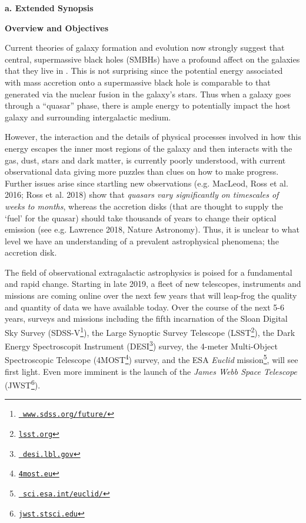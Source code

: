 \documentclass[oneside, a4paper, onecolumn, 11pt]{article}
\begin{document}
\smallskip
\smallskip
\noindent
{\bf{\textcolor{Cerulean}{a. Extended Synopsis}}} 
\vspace{6pt}

\noindent
\large
{\bf{\textcolor{Cerulean}{Overview and Objectives}}}
\normalsize

\smallskip
\noindent
Current theories of galaxy formation and evolution now strongly
suggest that central, supermassive black holes (SMBHs) have a profound
affect on the galaxies that they live in \citep{Hopkins2011}. 
 This is not surprising since
the potential energy associated with mass accretion onto a
supermassive black hole is comparable to that generated via the
nuclear fusion in the galaxy's stars. Thus when a galaxy goes through
a ``quasar'' phase, there is ample energy to
potentially impact the host galaxy and surrounding intergalactic
medium.

\smallskip
\smallskip
\noindent
However, the interaction and the details of physical processes involved in how
this energy escapes the inner most regions of the galaxy and then
interacts with the gas, dust, stars and dark matter, is currently poorly understood, 
with current observational data giving more puzzles
than clues on how to make progress. Further issues arise since startling new 
observations (e.g. MacLeod, Ross et al. 2016; Ross et al. 2018) show that {\it
quasars vary significantly on timescales of weeks to months}, whereas the
accretion disks (that are thought to supply the `fuel' for the quasar) 
should take thousands of years to change their optical emission (see
e.g. Lawrence 2018, Nature Astronomy).  Thus, it is unclear to what level we have 
an understanding of a prevalent astrophysical phenomena; the
accretion disk.


\smallskip
\smallskip
\noindent
The field of observational extragalactic astrophysics is poised for a
fundamental and rapid change. 
Starting in late 2019, a fleet of new telescopes, instruments and missions are coming 
online over the next few years that will leap-frog the quality and
quantity of data we have available today. Over the course of the next
5-6 years, surveys and missions including the fifth incarnation of the
Sloan Digital Sky Survey
(SDSS-V\footnote{\href{www.sdss.org/future/}{{\tt
www.sdss.org/future/}}}), the Large Synoptic Survey Telescope
(LSST\footnote{\href{lsst.org}{{\tt lsst.org}}}), the Dark Energy
Spectroscopit Instrument (DESI\footnote{\href{desi.lbl.gov}{{\tt
desi.lbl.gov}}}) survey, the 4-meter Multi-Object Spectroscopic
Telescope (4MOST\footnote{\href{4most.eu}{{\tt 4most.eu}}}) survey,
and the ESA {\it Euclid}
mission\footnote{\href{sci.esa.int/euclid/}{{\tt
sci.esa.int/euclid/}}}, will see first light. Even more imminent is
the launch of the {\it James Webb Space Telescope}
(JWST\footnote{\href{jwst.stsci.edu}{{\tt jwst.stsci.edu}}}).
\end{document}
